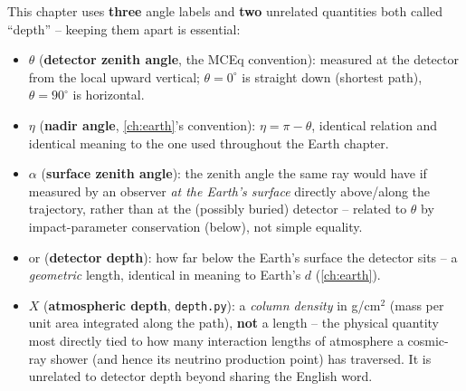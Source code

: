 \begin{notebox}[title={Two Angles and Two ``Depths''}]
This chapter uses \textbf{three} angle labels and \textbf{two} unrelated
quantities both called ``depth'' -- keeping them apart is essential:
\begin{itemize}
  \item $\theta$ (\textbf{detector zenith angle}, the MCEq convention):
    measured at the detector from the local upward vertical;
    $\theta=0^\circ$ is straight down (shortest path), $\theta=90^\circ$ is
    horizontal.
  \item $\eta$ (\textbf{nadir angle}, \cref{ch:earth}'s convention):
    $\eta=\pi-\theta$, identical relation and identical meaning to the one
    used throughout the Earth chapter.
  \item $\alpha$ (\textbf{surface zenith angle}): the zenith angle the same
    ray would have if measured by an observer \emph{at the Earth's
    surface} directly above/along the trajectory, rather than at the
    (possibly buried) detector -- related to $\theta$ by impact-parameter
    conservation (below), not simple equality.
  \item {} or  (\textbf{detector depth}): how far
    below the Earth's surface the detector sits -- a \emph{geometric}
    length, identical in meaning to Earth's $d$ (\cref{ch:earth}).
  \item $X$ (\textbf{atmospheric depth}, \texttt{depth.py}): a
    \emph{column density} in g/cm$^2$ (mass per unit area integrated along
    the path), \textbf{not} a length -- the physical quantity most
    directly tied to how many interaction lengths of atmosphere a
    cosmic-ray shower (and hence its neutrino production point) has
    traversed. It is unrelated to detector depth beyond sharing the English
    word.
\end{itemize}
\end{notebox}

